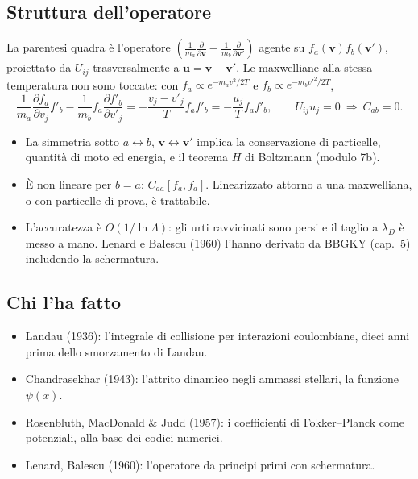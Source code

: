 \subsection{Struttura dell'operatore}
La parentesi quadra è l'operatore $\left(\frac{1}{m_a}\frac{\partial}{\partial\mathbf{v}}-\frac{1}{m_b}\frac{\partial}{\partial\mathbf{v}'}\right)$ agente su $f_a(\mathbf{v})f_b(\mathbf{v}')$, proiettato da $U_{ij}$ trasversalmente a $\mathbf{u}=\mathbf{v}-\mathbf{v}'$. Le maxwelliane alla stessa temperatura non sono toccate: con $f_a\propto e^{-m_av^2/2T}$ e $f_b\propto e^{-m_bv'^2/2T}$,
\begin{equation}
\frac{1}{m_a}\frac{\partial f_a}{\partial v_j}f'_b-\frac{1}{m_b}f_a\frac{\partial f'_b}{\partial v'_j}=-\frac{v_j-v'_j}{T}f_af'_b=-\frac{u_j}{T}f_af'_b,\qquad U_{ij}u_j=0\ \Rightarrow\ C_{ab}=0.
\end{equation}
\begin{itemize}
\item La simmetria sotto $a\leftrightarrow b$, $\mathbf{v}\leftrightarrow\mathbf{v}'$ implica la conservazione di particelle, quantità di moto ed energia, e il teorema $H$ di Boltzmann (modulo 7b).
\item È non lineare per $b=a$: $C_{aa}[f_a,f_a]$. Linearizzato attorno a una maxwelliana, o con particelle di prova, è trattabile.
\item L'accuratezza è $O(1/\ln\Lambda)$: gli urti ravvicinati sono persi e il taglio a $\lambda_D$ è messo a mano. Lenard e Balescu (1960) l'hanno derivato da BBGKY (cap.~5) includendo la schermatura.
\end{itemize}

\subsection{Chi l'ha fatto}
\begin{itemize}
\item Landau (1936): l'integrale di collisione per interazioni coulombiane, dieci anni prima dello smorzamento di Landau.
\item Chandrasekhar (1943): l'attrito dinamico negli ammassi stellari, la funzione $\psi(x)$.
\item Rosenbluth, MacDonald \& Judd (1957): i coefficienti di Fokker--Planck come potenziali, alla base dei codici numerici.
\item Lenard, Balescu (1960): l'operatore da principi primi con schermatura.
\end{itemize}

